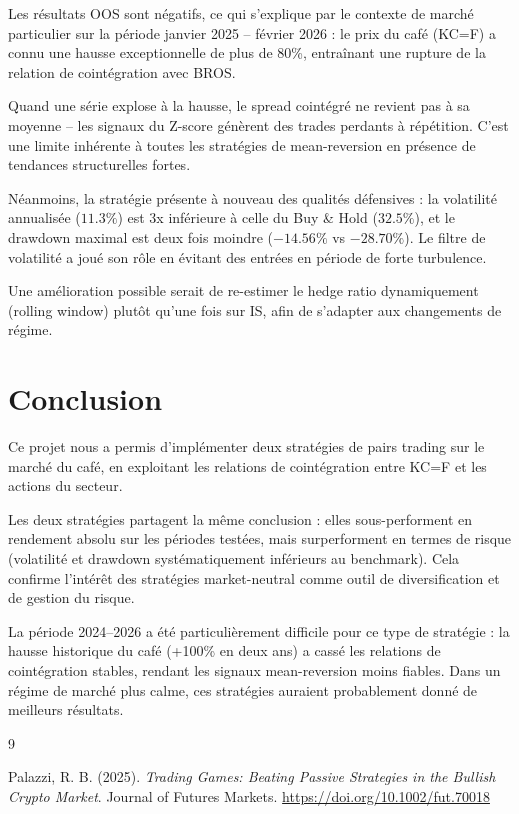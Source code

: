 \documentclass[12pt, a4paper]{article}
\begin{document}
Les résultats OOS sont négatifs, ce qui s'explique par le contexte de
marché particulier sur la période janvier 2025 -- février 2026 : le prix
du café (KC=F) a connu une hausse exceptionnelle de plus de 80\%,
entraînant une rupture de la relation de cointégration avec BROS.

Quand une série explose à la hausse, le spread cointégré ne revient
pas à sa moyenne -- les signaux du Z-score génèrent des trades perdants
à répétition. C'est une limite inhérente à toutes les stratégies de
mean-reversion en présence de tendances structurelles fortes.

Néanmoins, la stratégie présente à nouveau des qualités défensives :
la volatilité annualisée ($11.3\%$) est 3x inférieure à celle
du Buy \& Hold ($32.5\%$), et le drawdown maximal est deux fois moindre
($-14.56\%$ vs $-28.70\%$). Le filtre de volatilité a joué son rôle en
évitant des entrées en période de forte turbulence.

Une amélioration possible serait de re-estimer le hedge ratio
dynamiquement (rolling window) plutôt qu'une fois sur IS, afin de
s'adapter aux changements de régime.

\newpage

\section{Conclusion}

Ce projet nous a permis d'implémenter deux stratégies de pairs trading
sur le marché du café, en exploitant les relations de cointégration entre
KC=F et les actions du secteur.

Les deux stratégies partagent la même conclusion : elles sous-performent
en rendement absolu sur les périodes testées, mais surperforment
en termes de risque (volatilité et drawdown systématiquement inférieurs au
benchmark). Cela confirme l'intérêt des stratégies market-neutral comme
outil de diversification et de gestion du risque.

La période 2024--2026 a été particulièrement difficile pour ce type de
stratégie : la hausse historique du café (+100\% en deux ans) a cassé
les relations de cointégration stables, rendant les signaux mean-reversion
moins fiables. Dans un régime de marché plus calme, ces stratégies auraient
probablement donné de meilleurs résultats.

\begin{thebibliography}{9}

Palazzi, R. B. (2025).
\textit{Trading Games: Beating Passive Strategies in the Bullish Crypto Market}.
Journal of Futures Markets.
\url{https://doi.org/10.1002/fut.70018}

\end{thebibliography}
\end{document}
